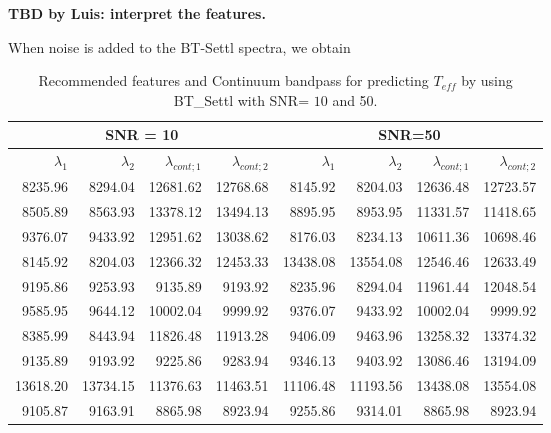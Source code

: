 {\bf TBD by Luis: interpret the features.}

When noise is added to the BT-Settl spectra, we obtain 


\begin{table}
\begin{center}
\begin{tabular}{rrrr | rrrr}
  \hline
 \multicolumn{4}{c}{SNR = 10} &  \multicolumn{4}{c}{SNR=50} \\
  \hline
$\lambda_1$ & $\lambda_2$ & $\lambda_{cont;1}$ & $\lambda_{cont;2} $ & $\lambda_1$ & $\lambda_2$ & $\lambda_{cont;1}$ & $\lambda_{cont;2} $ \\ 
  \hline
8235.96  & 8294.04   & 12681.62 & 12768.68   &  8145.92 & 8204.03   & 12636.48 & 12723.57 \\   
8505.89  & 8563.93   & 13378.12 & 13494.13   &  8895.95 & 8953.95   & 11331.57 & 11418.65 \\     
9376.07  & 9433.92   & 12951.62 & 13038.62   &  8176.03 & 8234.13   & 10611.36 & 10698.46 \\      
8145.92  & 8204.03   & 12366.32 & 12453.33   &  13438.08 & 13554.08 & 12546.46 & 12633.49 \\     
9195.86  & 9253.93   & 9135.89 & 9193.92     &  8235.96 & 8294.04   & 11961.44 & 12048.54 \\      
9585.95  & 9644.12   & 10002.04 & 9999.92    &  9376.07 & 9433.92   & 10002.04 & 9999.92  \\   
8385.99  & 8443.94   & 11826.48 & 11913.28   &  9406.09 & 9463.96   & 13258.32 & 13374.32 \\    
9135.89  & 9193.92   & 9225.86 & 9283.94     &  9346.13 & 9403.92   & 13086.46 & 13194.09 \\   
13618.20 & 13734.15  & 11376.63 & 11463.51   &  11106.48 & 11193.56 & 13438.08 & 13554.08 \\    
9105.87  & 9163.91   & 8865.98 & 8923.94     &  9255.86 & 9314.01   & 8865.98  & 8923.94  \\    
\hline
\end{tabular}
\caption {Recommended features and Continuum bandpass for predicting $ T_{eff} $ 
      by using BT\_Settl with SNR= $ 10 $ and 50.} \label{tab:tab_SNR1050_T} 
\end{center}
\end{table}

